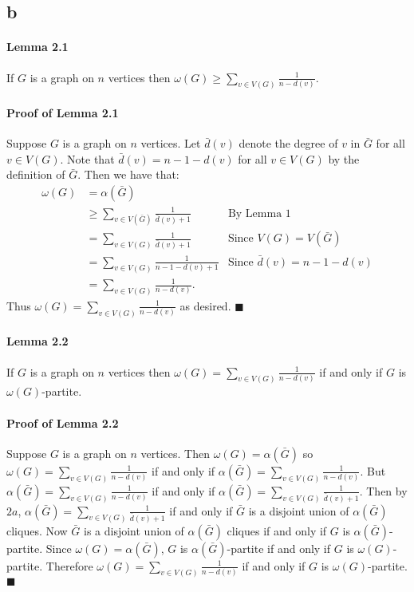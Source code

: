 \documentclass[letterpaper,12pt,oneside,onecolumn]{article}
\begin{document}
\subsection*{b}
\paragraph{Lemma 2.1}
If $G$ is a graph on $n$ vertices then $\omega(G) \geq \sum_{v \in V(G)} \frac{1}{n-d(v)}$.
\paragraph{Proof of Lemma 2.1}
Suppose $G$ is a graph on $n$ vertices. Let $\bar{d}(v)$ denote the degree of $v$ in $\bar{G}$ for all $v \in V(G)$. Note that $\bar{d}(v) = n-1-d(v)$ for all $v \in V(G)$ by the definition of $\bar{G}$. Then we have that:
\begin{align*}
\omega(G) &= \alpha(\bar{G}) \\
&\geq \sum_{v \in V(\bar{G})} \frac{1}{\bar{d}(v) + 1} &\text{By Lemma $1$}\\
&= \sum_{v \in V(G)} \frac{1}{\bar{d}(v) + 1} &\text{Since $V(G) = V(\bar{G})$}\\
&= \sum_{v \in V(G)} \frac{1}{n - 1 - d(v) + 1} &\text{Since $\bar{d}(v) = n-1-d(v)$}\\
&=\sum_{v \in V(G)} \frac{1}{n-d(v)}.
\end{align*}
Thus $\omega(G) = \sum_{v \in V(G)} \frac{1}{n-d(v)}$ as desired. $\blacksquare$
\paragraph{Lemma 2.2}
If $G$ is a graph on $n$ vertices then $\omega(G) = \sum_{v \in V(G)} \frac{1}{n-d(v)}$ if and only if $G$ is $\omega(G)$-partite.
\paragraph{Proof of Lemma 2.2}
Suppose $G$ is a graph on $n$ vertices. Then $\omega(G) = \alpha(\bar{G})$ so $\omega(G) = \sum_{v \in V(G)} \frac{1}{n-d(v)}$ if and only if $\alpha(\bar{G}) = \sum_{v \in V(G)} \frac{1}{n-d(v)}$. But $\alpha(\bar{G}) = \sum_{v \in V(G)} \frac{1}{n-d(v)}$ if and only if $\alpha(\bar{G}) = \sum_{v \in V(G)} \frac{1}{\bar{d}(v) + 1}$. Then by $2a$, $\alpha(\bar{G}) = \sum_{v \in V(G)} \frac{1}{\bar{d}(v) + 1}$  if and only if $\bar{G}$ is a disjoint union of $\alpha(\bar{G})$ cliques. Now $\bar{G}$ is a disjoint union of $\alpha(\bar{G})$ cliques if and only if $G$ is $\alpha(\bar{G})$-partite. Since $\omega(G) = \alpha(\bar{G})$, $G$ is $\alpha(\bar{G})$-partite if and only if $G$ is $\omega(G)$-partite. Therefore $\omega(G) = \sum_{v \in V(G)} \frac{1}{n-d(v)}$ if and only if $G$ is $\omega(G)$-partite. $\blacksquare$
\end{document}
